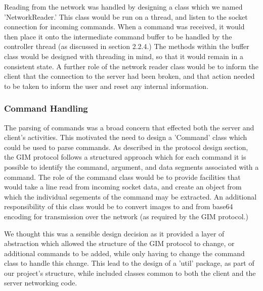Reading from the network was handled by designing a class which we named 'NetworkReader.' This class would be run on a thread, and listen to the socket connection for incoming commands. When a command was received, it would then place it onto the intermediate command buffer to be handled by the controller thread (as discussed in section 2.2.4.) The methods within the buffer class would be designed with threading in mind, so that it would remain in a consistent state. A further role of the network reader class would be to inform the client that the connection to the server had been broken, and that action needed to be taken to inform the user and reset any internal information.

\subsubsection {Command Handling }

The parsing of commands was a broad concern that effected both the server and client's activities. This motivated the need to design a 'Command' class which could be used to parse commands. As described in the protocol design section, the GIM protocol follows a structured approach which for each command it is possible to identify the command, argument, and data segments associated with a command. The role of the command class would be to provide facilities that would take a line read from incoming socket data, and create an object from which the individual segements of the command may be extracted. An additional responsibility of this class would be to convert images to and from base64 encoding for transmission over the network (as required by the GIM protocol.)

We thought this was a sensible design decision as it provided a layer of abstraction which allowed the structure of the GIM protocol to change, or additional commands to be added, while only having to change the command class to handle this change. This lead to the design of a 'util' package, as part of our project's structure, while included classes common to both the client and the server networking code. 















